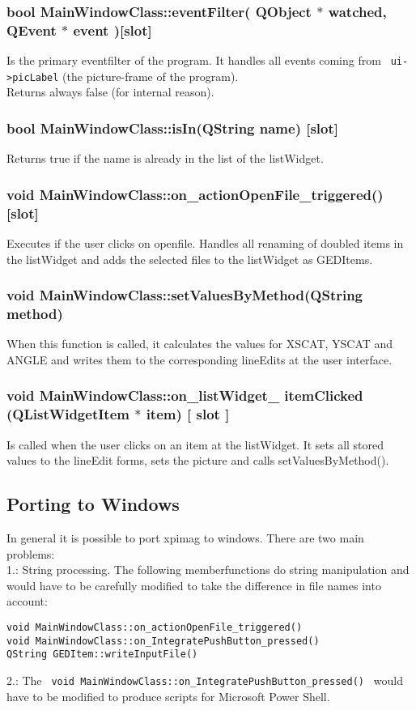 \subsubsection{bool MainWindowClass::eventFilter( QObject $\ast$ watched, QEvent  $\ast$ event )[slot]}
Is the primary eventfilter of the program. It handles all events coming from \lstinline$ ui->picLabel$ (the picture-frame of the program). \\
Returns always false (for internal reason). 

\subsubsection{bool MainWindowClass::isIn(QString name)  [slot]  } 
Returns true if the name is already in the list of the listWidget. 

\subsubsection{ void MainWindowClass::on\_actionOpenFile\_triggered()  [slot] }
Executes if the user clicks on openfile. Handles all renaming of doubled items in the listWidget and adds the selected files to the listWidget as GEDItems. 

\subsubsection{void MainWindowClass::setValuesByMethod(QString method) }
When this function is called, it calculates the values for XSCAT, YSCAT and ANGLE and writes them to the corresponding lineEdits at the user interface.  

\subsubsection{void MainWindowClass::on\_listWidget\_ itemClicked (QListWidgetItem  $\ast$ item) [ slot ] }
Is called when the user clicks on an item at the listWidget. It sets all stored values to the lineEdit forms, sets the picture and calls  setValuesByMethod(). 

\subsection{Porting to Windows} 
In general it is possible to port xpimag to windows. There are two main problems: \\
1.: String processing. The following memberfunctions do string manipulation and would have to be carefully modified to take the difference in file names into account: 
\begin{lstlisting}
void MainWindowClass::on_actionOpenFile_triggered()
void MainWindowClass::on_IntegratePushButton_pressed()
QString GEDItem::writeInputFile() 
\end{lstlisting}
2.: The \lstinline! void MainWindowClass::on_IntegratePushButton_pressed() ! would have to be modified to produce scripts for Microsoft Power Shell. 


